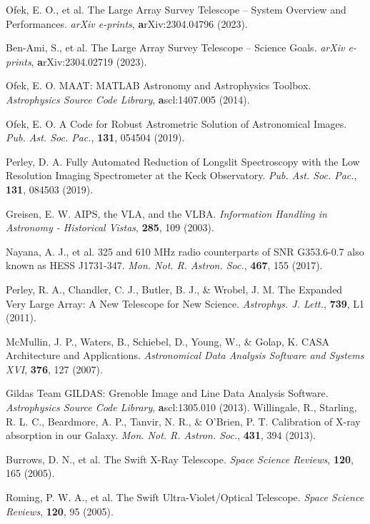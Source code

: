 \documentclass{nature_plusfigure}
\newcommand{\mn}{{Mon. Not. R. Astron. Soc.}}
\newcommand{\mnras}{\mn}
\newcommand{\apjl}{{Astrophys. J. Lett.}}
\newcommand{\pasp}{{Pub. Ast. Soc. Pac.}}
\newcommand{\ssr}{Space Science Reviews}
\begin{document}
\begin{methods}
\begin{thebibliography}{10}
  Ofek, E. O., et al. The Large Array Survey Telescope -- System Overview and Performances. \emph{arXiv e-prints}, \textbf arXiv:2304.04796 (2023). 

 Ben-Ami, S., et al. The Large Array Survey Telescope -- Science Goals. \emph{arXiv e-prints}, \textbf arXiv:2304.02719 (2023). 

 Ofek, E. O. MAAT: MATLAB Astronomy and Astrophysics Toolbox. \emph{Astrophysics Source Code Library}, \textbf ascl:1407.005 (2014). 

 Ofek, E. O. A Code for Robust Astrometric Solution of Astronomical Images. \emph{\pasp}, \textbf{131}, 054504 (2019). 

 Perley, D. A. Fully Automated Reduction of Longslit Spectroscopy with the Low Resolution Imaging Spectrometer at the Keck Observatory. \emph{\pasp}, \textbf{131}, 084503 (2019). 


  Greisen, E. W. AIPS, the VLA, and the VLBA. \emph{Information Handling in Astronomy - Historical Vistas}, \textbf{285}, 109 (2003). 

 Nayana, A. J., et al. 325 and 610 MHz radio counterparts of SNR G353.6-0.7 also known as HESS J1731-347. \emph{\mnras}, \textbf{467}, 155 (2017). 

 Perley, R. A., Chandler, C. J., Butler, B. J., \& Wrobel, J. M. The Expanded Very Large Array: A New Telescope for New Science. \emph{\apjl}, \textbf{739}, L1 (2011). 

 McMullin, J. P., Waters, B., Schiebel, D., Young, W., \& Golap, K. CASA Architecture and Applications. \emph{Astronomical Data Analysis Software and Systems XVI}, \textbf{376}, 127 (2007). 

 Gildas Team GILDAS: Grenoble Image and Line Data Analysis Software. \emph{Astrophysics Source Code Library}, \textbf ascl:1305.010 (2013). 
 Willingale, R., Starling, R. L. C., Beardmore, A. P., Tanvir, N. R., \& O'Brien, P. T. Calibration of X-ray absorption in our Galaxy. \emph{\mnras}, \textbf{431}, 394 (2013). 


 Burrows, D. N., et al. The Swift X-Ray Telescope. \emph{\ssr}, \textbf{120}, 165 (2005). 

 Roming, P. W. A., et al. The Swift Ultra-Violet/Optical Telescope. \emph{\ssr}, \textbf{120}, 95 (2005).


\end{thebibliography}
\end{methods}
\end{document}
